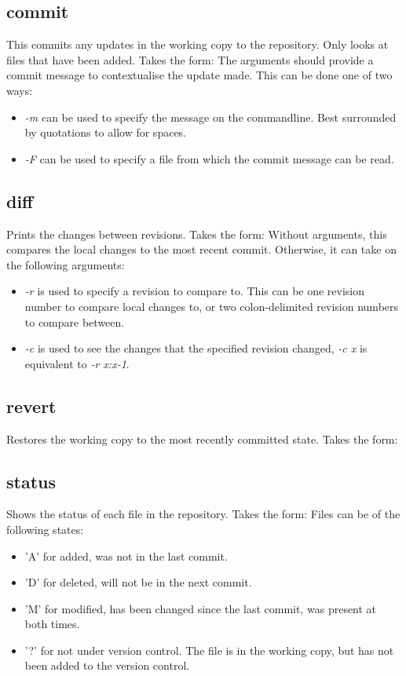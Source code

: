 \documentclass{article}
\begin{document}
\subsection{commit}
This commits any updates in the working copy to the repository. Only looks at files that have been added. Takes the form:
The arguments should provide a commit message to contextualise the update made. This can be done one of two ways:
\begin{itemize}
    \item \textit{-m} can be used to specify the message on the commandline. Best surrounded by quotations to allow for spaces.
    \item \textit{-F} can be used to specify a file from which the commit message can be read.
\end{itemize}

\subsection{diff}
Prints the changes between revisions. Takes the form:
Without arguments, this compares the local changes to the most recent commit. Otherwise, it can take on the following arguments:
\begin{itemize}
    \item \textit{-r} is used to specify a revision to compare to. This can be one revision number to compare local changes to, or two colon-delimited revision numbers to compare between.
    \item \textit{-c} is used to see the changes that the specified revision changed, \textit{-c x} is equivalent to \textit{-r x:x-1}.
\end{itemize}

\subsection{revert}
Restores the working copy to the most recently committed state. Takes the form:

\subsection{status}
Shows the status of each file in the repository. Takes the form:
Files can be of the following states:
\begin{itemize}
    \item 'A' for added, was not in the last commit.
    \item 'D' for deleted, will not be in the next commit.
    \item 'M' for modified, has been changed since the last commit, was present at both times.
    \item '?' for not under version control. The file is in the working copy, but has not been added to the version control.
\end{itemize}
\end{document}
